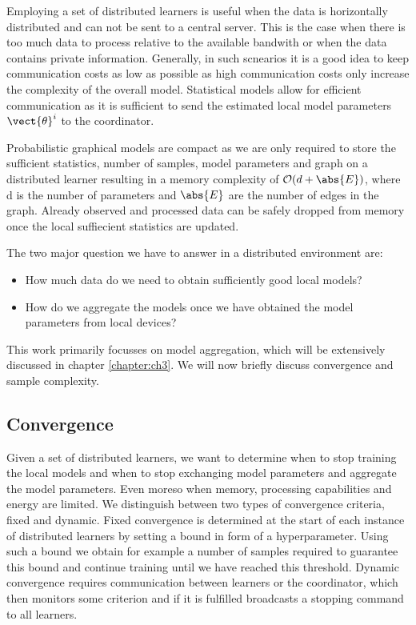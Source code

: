Employing a set of distributed  learners is useful when the data is horizontally distributed and can not be sent to a central server.
This is the  case when there is too much data to process relative to the available bandwith or when the data contains private information.
Generally, in such scnearios it is a good idea to keep communication costs as low as possible as high communication costs only increase the complexity of the overall model.
Statistical models allow for efficient communication as it is sufficient to send the estimated local model parameters $\vect{\theta}^i$ to the coordinator. 

Probabilistic graphical models are compact as we are only required to store the sufficient statistics, number of samples, model parameters and graph on a distributed learner resulting in a memory complexity of $\mathcal{O}(d + \abs{E})$, where d is the number of parameters and $\abs{E}$ are the number of edges in the graph. 
Already observed and processed data can be safely dropped from memory once the local suffiecient statistics are updated.

The two major question we have to answer in a distributed environment are:
\begin{itemize}
    \item How much data do we need to obtain sufficiently good local models?
    \item How do we aggregate the models once we have obtained the model parameters from local devices?
\end{itemize}

This work primarily focusses on model aggregation, which will be extensively discussed in chapter \ref{chapter:ch3}. 
We will now briefly discuss convergence and sample complexity.

\subsection{Convergence}
Given a set of distributed learners, we want to determine when to stop training the local models and when to stop exchanging model parameters and aggregate the model parameters.
Even moreso when memory, processing capabilities and energy are limited.
We distinguish between two types of convergence criteria, fixed and dynamic.
Fixed convergence is determined at the start of each instance of distributed learners by setting a bound in form of a hyperparameter.
Using such a bound we obtain for example a number of samples required to guarantee this bound and continue training until we have reached this threshold.
Dynamic convergence requires communication between learners or the coordinator, which then monitors some criterion and if it is fulfilled broadcasts a stopping command to all learners. 

